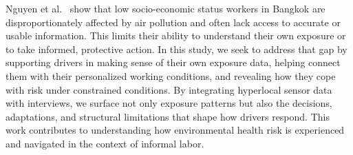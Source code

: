 Nguyen et al.~\cite{nguyen2023bangkokpollution} show that low socio-economic status workers in Bangkok are disproportionately affected by air pollution and often lack access to accurate or usable information. 
This limits their ability to understand their own exposure or to take informed, protective action. 
In this study, we seek to address that gap by supporting drivers in making sense of their own exposure data, helping connect them with their personalized working conditions, and revealing how they cope with risk under constrained conditions. 
By integrating hyperlocal sensor data with interviews, we surface not only exposure patterns but also the decisions, adaptations, and structural limitations that shape how drivers respond. 
This work contributes to understanding how environmental health risk is experienced and navigated in the context of informal labor.








